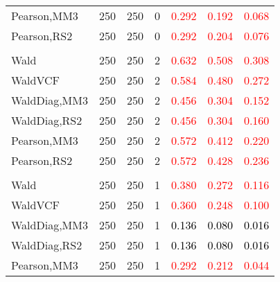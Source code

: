 \documentclass[
]{article}
\begin{document}
\begin{table}[H]
{\begin{tabular}[t]{lrrrrrr}
\hspace{1em}Pearson,MM3 & 250 & 250 & 0 & \textcolor{red}{0.292} & \textcolor{red}{0.192} & \textcolor{red}{0.068}\\
\hspace{1em}Pearson,RS2 & 250 & 250 & 0 & \textcolor{red}{0.292} & \textcolor{red}{0.204} & \textcolor{red}{0.076}\\
\addlinespace[0.3em]
\multicolumn{7}{l}{\textbf{1F 15V}}\\
\hspace{1em}Wald & 250 & 250 & 2 & \textcolor{red}{0.632} & \textcolor{red}{0.508} & \textcolor{red}{0.308}\\
\hspace{1em}WaldVCF & 250 & 250 & 2 & \textcolor{red}{0.584} & \textcolor{red}{0.480} & \textcolor{red}{0.272}\\
\hspace{1em}WaldDiag,MM3 & 250 & 250 & 2 & \textcolor{red}{0.456} & \textcolor{red}{0.304} & \textcolor{red}{0.152}\\
\hspace{1em}WaldDiag,RS2 & 250 & 250 & 2 & \textcolor{red}{0.456} & \textcolor{red}{0.304} & \textcolor{red}{0.160}\\
\hspace{1em}Pearson,MM3 & 250 & 250 & 2 & \textcolor{red}{0.572} & \textcolor{red}{0.412} & \textcolor{red}{0.220}\\
\hspace{1em}Pearson,RS2 & 250 & 250 & 2 & \textcolor{red}{0.572} & \textcolor{red}{0.428} & \textcolor{red}{0.236}\\
\addlinespace[0.3em]
\multicolumn{7}{l}{\textbf{2F 10V}}\\
\hspace{1em}Wald & 250 & 250 & 1 & \textcolor{red}{0.380} & \textcolor{red}{0.272} & \textcolor{red}{0.116}\\
\hspace{1em}WaldVCF & 250 & 250 & 1 & \textcolor{red}{0.360} & \textcolor{red}{0.248} & \textcolor{red}{0.100}\\
\hspace{1em}WaldDiag,MM3 & 250 & 250 & 1 & \textcolor{black}{0.136} & \textcolor{black}{0.080} & \textcolor{black}{0.016}\\
\hspace{1em}WaldDiag,RS2 & 250 & 250 & 1 & \textcolor{black}{0.136} & \textcolor{black}{0.080} & \textcolor{black}{0.016}\\
\hspace{1em}Pearson,MM3 & 250 & 250 & 1 & \textcolor{red}{0.292} & \textcolor{red}{0.212} & \textcolor{red}{0.044}\\

\end{tabular}}
\end{table}
\end{document}
